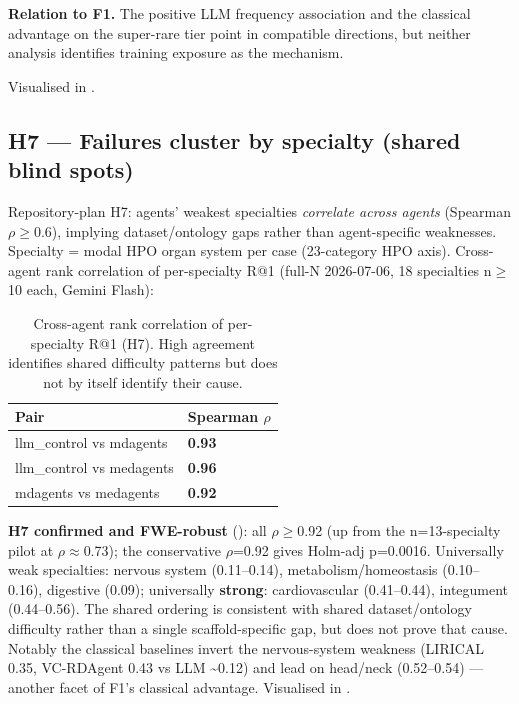 \textbf{Relation to F1.} The positive LLM frequency association and the classical
advantage on the super-rare tier point in compatible directions, but neither
analysis identifies training exposure as the mechanism.

Visualised in .

\subsection{H7 --- Failures cluster by specialty (shared blind spots)}\label{sec-7-9}

Repository-plan H7: agents' weakest specialties \emph{correlate across agents}
(Spearman \ensuremath{\rho}\ensuremath{\geq}0.6), implying dataset/ontology gaps rather than agent-specific
weaknesses. Specialty = modal HPO organ system per case (23-category HPO axis).
Cross-agent rank correlation of per-specialty R@1 (full-N 2026-07-06, 18 specialties n\ensuremath{\geq}10 each, Gemini Flash):

\begin{table}[t]
\centering\scriptsize\setlength{\tabcolsep}{3.5pt}
\caption{Cross-agent rank correlation of per-specialty R@1 (H7). High agreement identifies shared difficulty patterns but does not by itself identify their cause.}\label{tbl:h7}
\begin{tabular}{@{}
ll@{}}
\toprule
Pair & Spearman \ensuremath{\rho} \\
\midrule
llm\_control vs mdagents & \textbf{0.93} \\
llm\_control vs medagents & \textbf{0.96} \\
mdagents vs medagents & \textbf{0.92} \\
\bottomrule
\end{tabular}
\end{table}

\textbf{H7 confirmed and FWE-robust} (): all \ensuremath{\rho}\ensuremath{\geq}0.92 (up from the
n=13-specialty pilot at \ensuremath{\rho}\ensuremath{\approx}0.73); the conservative \ensuremath{\rho}=0.92 gives Holm-adj
p=0.0016. Universally weak specialties: nervous system
(0.11--0.14), metabolism/homeostasis (0.10--0.16), digestive (0.09); universally
\textbf{strong}: cardiovascular (0.41--0.44), integument (0.44--0.56). The shared
ordering is consistent with shared dataset/ontology difficulty rather than a
single scaffold-specific gap, but does not prove that cause.
Notably the classical baselines invert the nervous-system weakness (LIRICAL
0.35, VC-RDAgent 0.43 vs LLM \textasciitilde0.12) and lead on head/neck (0.52--0.54) --- another
facet of F1's classical advantage. Visualised in .


